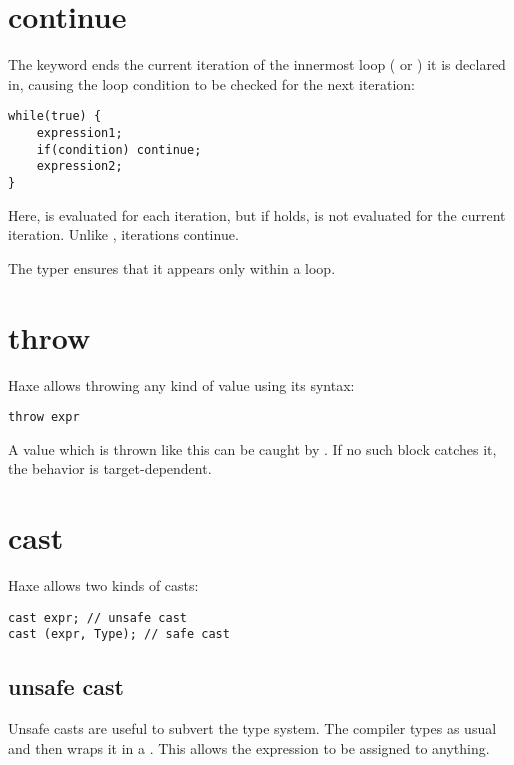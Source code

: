 \section{continue}
\label{expression-continue}

The  keyword ends the current iteration of the innermost loop ( or ) it is declared in, causing the loop condition to be checked for the next iteration:

\begin{lstlisting}
while(true) {
	expression1;
	if(condition) continue;
	expression2;
}
\end{lstlisting}

Here,  is evaluated for each iteration, but if  holds,  is not evaluated for the current iteration. Unlike , iterations continue.

The typer ensures that it appears only within a loop.


\section{throw}
\label{expression-throw}

Haxe allows throwing any kind of value using its  syntax:

\begin{lstlisting}
throw expr
\end{lstlisting}

A value which is thrown like this can be caught by . If no such block catches it, the behavior is target-dependent.


\section{cast}
\label{expression-cast}

Haxe allows two kinds of casts:

\begin{lstlisting}
cast expr; // unsafe cast
cast (expr, Type); // safe cast
\end{lstlisting}

\subsection{unsafe cast}
\label{expression-cast-unsafe}

Unsafe casts are useful to subvert the type system. The compiler types  as usual and then wraps it in a . This allows the expression to be assigned to anything.


